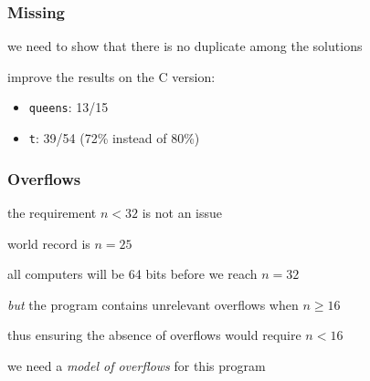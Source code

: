 \documentclass[compress]{beamer}
\begin{document}
\begin{frame}
  \frametitle{Missing}

  we need to show that there is no duplicate among the solutions

  \Pause
  improve the results on the C version:
  \begin{itemize}
  \item \texttt{queens}: 13/15
  \item \texttt{t}: 39/54 (72\% instead of 80\%)
  \end{itemize}
\end{frame}

\begin{frame}
  \frametitle{Overflows}
  the requirement $n<32$ is not an issue

  world record is $n=25$ 

  all computers will be 64 bits before we reach $n=32$

  \Pause
  \emph{but} the program contains unrelevant overflows when $n\ge 16$

  thus ensuring the absence of overflows would require $n<16$

  we need a \emph{model of overflows} for this program
\end{frame}
\end{document}
